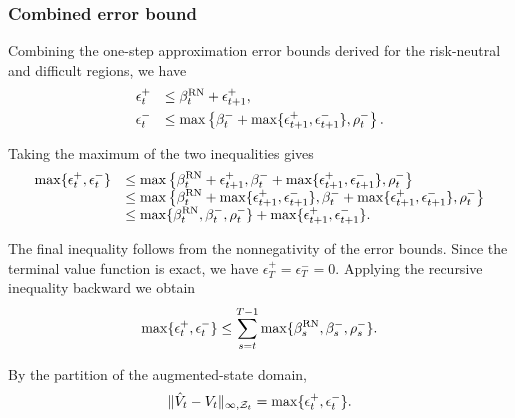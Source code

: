 \subsubsection{Combined error bound}
\label{theory:combined-error}

Combining the one-step approximation error bounds
derived for the risk-neutral and difficult regions,
we have
\begin{equation}
	\begin{array}{rl}
		\epsilon_t^+
		&\leq \beta_t^{\text{RN}}+\epsilon_{t+1}^+,\\[4pt]
		\epsilon_t^-
		&\leq \max\left\{
		\beta_t^-+
		\max\{\epsilon_{t+1}^+,\epsilon_{t+1}^-\},
		\rho_t^-
		\right\}.
	\end{array}
	\notag
\end{equation}

Taking the maximum of the two inequalities gives
\begin{equation}
	\begin{array}{rl}
		\max\{\epsilon_t^+,\epsilon_t^-\}
		&\displaystyle\leq
		\max\left\{
		\beta_t^{\text{RN}}+\epsilon_{t+1}^+,
		\beta_t^-+\max\{\epsilon_{t+1}^+,\epsilon_{t+1}^-\},
		\rho_t^-
		\right\}\\
		&\displaystyle\leq
		\max\left\{
		\beta_t^{\text{RN}}+
		\max\{\epsilon_{t+1}^+,\epsilon_{t+1}^-\},
		\beta_t^-+
		\max\{\epsilon_{t+1}^+,\epsilon_{t+1}^-\},
		\rho_t^-
		\right\}\\
		&\displaystyle\leq
		\max\{\beta_t^{\text{RN}},\beta_t^-,\rho_t^-\}
		+\max\{\epsilon_{t+1}^+,\epsilon_{t+1}^-\}.
	\end{array}
	\notag
	\label{combined-one-step-error}
\end{equation}

The final inequality follows from the nonnegativity
of the error bounds. Since the terminal value
function is exact, we have
$\epsilon_T^+=\epsilon_T^-=0$.
Applying the recursive inequality backward we obtain
\begin{equation}
	\max\{\epsilon_t^+,\epsilon_t^-\}
	\leq
	\sum_{s=t}^{T-1}
	\max\{\beta_s^{\text{RN}},\beta_s^-,\rho_s^-\}.
	\notag
	\label{combined-accumulated-error}
\end{equation}

By the partition of the augmented-state domain,
\begin{equation}
	\|\hat{V}_t-V_t\|_{\infty,\mathcal{Z}_t}
	=\max\{\epsilon_t^+,\epsilon_t^-\}.
	\notag
\end{equation}


